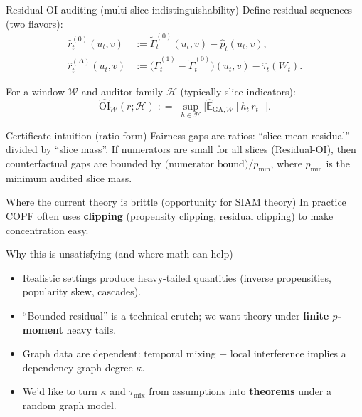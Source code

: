 \documentclass[aspectratio=169,11pt]{beamer}
\newcommand{\1}{\mathbbm{1}}
\newcommand{\Eb}{\widehat{\mathbb{E}}}
\newcommand{\cH}{\mathcal{H}}
\newcommand{\cW}{\mathcal{W}}
\newcommand{\defeq}{\mathrel{\mathop:}=}
\begin{document}
\begin{frame}{Residual-OI auditing (multi-slice indistinguishability)}
\small
Define residual sequences (two flavors):
\begin{align*}
\hat r_t^{(0)}(u_t,v) &:= \widetilde\Gamma_t^{(0)}(u_t,v) - \hat p_t(u_t,v), \\
\hat r_t^{(\Delta)}(u_t,v) &:= \big(\widetilde\Gamma_t^{(1)}-\widetilde\Gamma_t^{(0)}\big)(u_t,v) - \hat\tau_t(W_t).
\end{align*}

For a window $\cW$ and auditor family $\cH$ (typically slice indicators):
\[
\widehat{\mathrm{OI}}_{\cW}(r;\cH)
\;\defeq\;\sup_{h\in\cH}\Big|\Eb_{\mathrm{GA},\cW}[h_t\,r_t]\Big|.
\]

\begin{block}{Certificate intuition (ratio form)}
\small
Fairness gaps are ratios: ``slice mean residual'' divided by ``slice mass''.\newline
If numerators are small for all slices (Residual-OI), then counterfactual gaps are bounded by
\(\text{(numerator bound)} / p_{\min}\), where $p_{\min}$ is the minimum audited slice mass.
\end{block}
\end{frame}

\begin{frame}{Where the current theory is brittle (opportunity for SIAM theory)}
\small
In practice COPF often uses \textbf{clipping} (propensity clipping, residual clipping) to make concentration easy.
\vspace{0.4em}
\begin{block}{Why this is unsatisfying (and where math can help)}
\small
\begin{itemize}
  \item Realistic settings produce heavy-tailed quantities (inverse propensities, popularity skew, cascades).
  \item ``Bounded residual'' is a technical crutch; we want theory under \textbf{finite $p$-moment} heavy tails.
  \item Graph data are dependent: temporal mixing + local interference implies a dependency graph degree $\kappa$.
  \item We'd like to turn $\kappa$ and $\tau_{\mathrm{mix}}$ from assumptions into \textbf{theorems} under a random graph model.
\end{itemize}
\end{block}
\end{frame}
\end{document}

